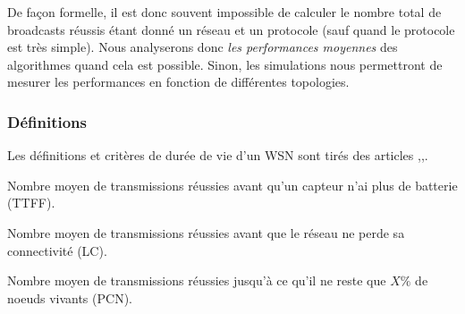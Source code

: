 De façon formelle, il est donc souvent impossible de calculer le nombre total de broadcasts réussis étant donné un réseau et un protocole (sauf quand le protocole est très simple). Nous analyserons donc \textit{les performances moyennes} des algorithmes quand cela est possible. Sinon, les simulations nous permettront de mesurer les performances en fonction de différentes topologies.

\subsubsection{Définitions}
Les définitions et critères de durée de vie d'un WSN sont tirés des articles \cite{Dietrich2009},\cite{Champ2009lifetime},\cite{Elleithy2011}. 

\begin{mylt}\label{TTFF}
Nombre moyen de transmissions réussies avant qu'un capteur n'ai plus de batterie (TTFF).
\end{mylt}
\begin{mylt}\label{LC}
Nombre moyen de transmissions réussies avant que le réseau ne perde sa connectivité (LC).
\end{mylt}
\begin{mylt}\label{PCN}
Nombre moyen de transmissions réussies jusqu'à ce qu'il ne reste que $X\%$ de noeuds vivants (PCN).
\end{mylt}



